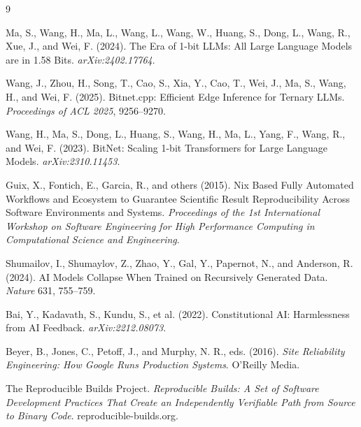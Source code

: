 \documentclass[11pt]{article}
\begin{document}
\begin{thebibliography}{9}

 Ma, S., Wang, H., Ma, L., Wang, L., Wang, W., Huang, S., Dong, L., Wang, R., Xue, J., and Wei, F. (2024). The Era of 1-bit LLMs: All Large Language Models are in 1.58 Bits. \emph{arXiv:2402.17764}.

 Wang, J., Zhou, H., Song, T., Cao, S., Xia, Y., Cao, T., Wei, J., Ma, S., Wang, H., and Wei, F. (2025). Bitnet.cpp: Efficient Edge Inference for Ternary LLMs. \emph{Proceedings of ACL 2025}, 9256--9270.

 Wang, H., Ma, S., Dong, L., Huang, S., Wang, H., Ma, L., Yang, F., Wang, R., and Wei, F. (2023). BitNet: Scaling 1-bit Transformers for Large Language Models. \emph{arXiv:2310.11453}.

 Guix, X., Fontich, E., Garcia, R., and others (2015). Nix Based Fully Automated Workflows and Ecosystem to Guarantee Scientific Result Reproducibility Across Software Environments and Systems. \emph{Proceedings of the 1st International Workshop on Software Engineering for High Performance Computing in Computational Science and Engineering}.

 Shumailov, I., Shumaylov, Z., Zhao, Y., Gal, Y., Papernot, N., and Anderson, R. (2024). AI Models Collapse When Trained on Recursively Generated Data. \emph{Nature} 631, 755--759.

 Bai, Y., Kadavath, S., Kundu, S., et al. (2022). Constitutional AI: Harmlessness from AI Feedback. \emph{arXiv:2212.08073}.

 Beyer, B., Jones, C., Petoff, J., and Murphy, N. R., eds. (2016). \emph{Site Reliability Engineering: How Google Runs Production Systems}. O'Reilly Media.

 The Reproducible Builds Project. \emph{Reproducible Builds: A Set of Software Development Practices That Create an Independently Verifiable Path from Source to Binary Code}. reproducible-builds.org.

\end{thebibliography}
\end{document}
